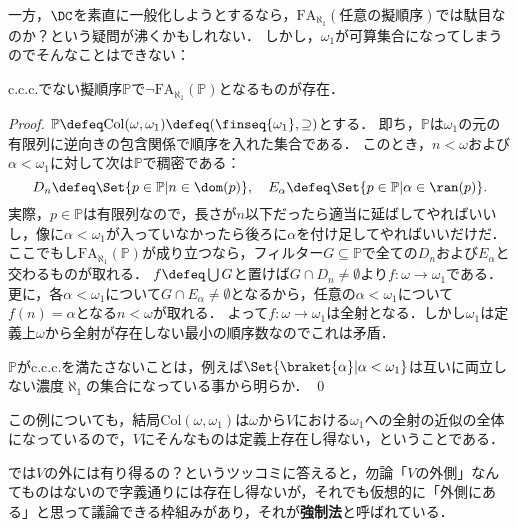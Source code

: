 \documentclass[a4j,leqno]{ltjsarticle}
\newcommand{\FA}{\mathrm{FA}}
\renewcommand{\emph}[1]{\textbf{\textsf{#1}}}
\begin{document}
一方，$\DC$を素直に一般化しようとするなら，$\FA_{\aleph_1}(\text{任意の擬順序})$では駄目なのか？という疑問が沸くかもしれない．
しかし，$\omega_1$が可算集合になってしまうのでそんなことはできない：
\begin{lemma}
 c.c.c.でない擬順序$\mathbb{P}$で$\neg \FA_{\aleph_1}(\mathbb{P})$となるものが存在．
\end{lemma}
\begin{proof}
 $\mathbb{P} \defeq \mathrm{Col}(\omega, \omega_1) \defeq (\finseq{\omega_1}, {\supseteq})$とする．
 即ち，$\mathbb{P}$は$\omega_1$の元の有限列に逆向きの包含関係で順序を入れた集合である．
 このとき，$n < \omega$および$\alpha < \omega_1$に対して次は$\mathbb{P}$で稠密である：
 \[
  D_n \defeq \Set{p \in \mathbb{P} | n \in \dom(p)}, \quad
  E_\alpha \defeq \Set{p \in \mathbb{P} | \alpha \in \ran(p)}.
 \]
 実際，$p \in \mathbb{P}$は有限列なので，長さが$n$以下だったら適当に延ばしてやればいいし，像に$\alpha < \omega_1$が入っていなかったら後ろに$\alpha$を付け足してやればいいだけだ．
 ここでもし$\FA_{\aleph_1}(\mathbb{P})$が成り立つなら，フィルター$G \subseteq \mathbb{P}$で全ての$D_n$および$E_\alpha$と交わるものが取れる．
 $f \defeq \bigcup G$と置けば$G \cap D_n \neq \emptyset$より$f: \omega \to \omega_1$である．
 更に，各$\alpha < \omega_1$について$G \cap E_\alpha \neq \emptyset$となるから，任意の$\alpha < \omega_1$について$f(n) = \alpha$となる$n < \omega$が取れる．
 よって$f: \omega \to \omega_1$は全射となる．しかし$\omega_1$は定義上$\omega$から全射が存在しない最小の順序数なのでこれは矛盾．

 $\mathbb{P}$がc.c.c.を満たさないことは，例えば$\Set{\braket{\alpha} | \alpha < \omega_1}$は互いに両立しない濃度$\aleph_1$の集合になっている事から明らか． \qed
\end{proof}
この例についても，結局$\mathrm{Col}(\omega, \omega_1)$は$\omega$から$V$における$\omega_1$への全射の近似の全体になっているので，$V$にそんなものは定義上存在し得ない，ということである．

では$V$の外には有り得るの？というツッコミに答えると，勿論「$V$の外側」なんてものはないので字義通りには存在し得ないが，それでも仮想的に「外側にある」と思って議論できる枠組みがあり，それが\emph{強制法}と呼ばれている．
\end{document}

